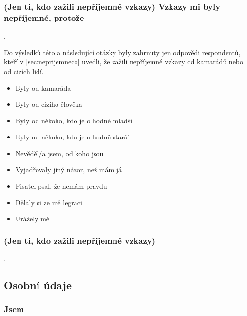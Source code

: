 \subsubsection{(Jen ti, kdo zažili nepříjemné vzkazy) Vzkazy mi byly nepříjemné, protože}

\qtype \pickMultiple \withOther.

Do výsledků této a následující otázky byly zahrnuty
jen odpovědi respondentů,
kteří v \ref{sec:neprijemneco} uvedli, že zažili nepříjemné vzkazy
od kamarádů nebo od cizích lidí.

\begin{itemize}
\item Byly od kamaráda
\item Byly od cizího člověka
\item Byly od někoho, kdo je o hodně mladší
\item Byly od někoho, kdo je o hodně starší
\item Nevěděl/a jsem, od koho jsou
\item Vyjadřovaly jiný názor, než mám já
\item Pisatel psal, že nemám pravdu
\item Dělaly si ze mě legraci
\item Urážely mě
\end{itemize}


\subsubsection{(Jen ti, kdo zažili nepříjemné vzkazy)}

\qtype \pickOne. \series




\pagebreak %

\subsection{Osobní údaje}\label{sec:osobni}

\subsubsection{Jsem}\label{sec:pohlavi}

